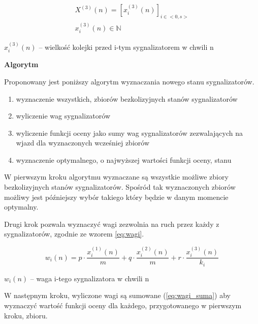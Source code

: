 \begin{equation}
	\begin{array}{c}
		X^{(3)} (n) = \left[ x^{(3)}_{i} (n) \right]_{i \in <0,s>}\\
		x^{(3)}_{i} (n) \in \mathbb{N}
	\end{array}
\end{equation}

\begin{math} x^{(3)}_{i} (n) \end{math} \textrm{ -- wielkość kolejki przed i-tym sygnalizatorem w chwili n}

\vspace{1.5cm}
\textbf{Algorytm}

Proponowany jest poniższy algorytm wyznaczania nowego stanu sygnalizatorów.
\begin{enumerate}
	\item wyznaczenie wszystkich, zbiorów bezkolizyjnych stanów sygnalizatorów
	\item wyliczenie wag sygnalizatorów
	\item wyliczenie funkcji oceny jako sumy wag sygnalizatorów zezwalających na wjazd dla wyznaczonych wcześniej zbiorów
	\item wyznaczenie optymalnego, o najwyższej wartości funkcji oceny, stanu
\end{enumerate}

\vspace{0.5cm}
W pierwszym kroku algorytmu wyznaczane są wszystkie możliwe zbiory bezkolizyjnych stanów sygnalizatorów.
Spośród tak wyznaczonych zbiorów możliwy jest późniejszy wybór takiego który będzie w danym momencie optymalny.

\vspace{0.5cm}
Drugi krok pozwala wyznaczyć wagi zezwolnia na ruch przez każdy z sygnalizatorów, zgodnie ze wzorem \ref{eq:wagi}.

\begin{equation}
\label{eq:wagi}
	w_{i} (n) = p \cdot \frac{x^{(1)}_{i} (n)}{m} + q \cdot \frac{x^{(2)}_{i} (n)}{m} + r \cdot \frac{x^{(3)}_{i} (n)}{k_{i}}
\end{equation}

\begin{math} w_{i} (n) \end{math} \textrm{ -- waga i-tego sygnalizatora w chwili n}

\vspace{0.5cm}
W następnym kroku, wyliczone wagi są sumowane (\ref{eq:wagi_suma}) aby wyznaczyć wartość funkcji oceny dla każdego, przygotowanego w pierwszym kroku, zbioru.

